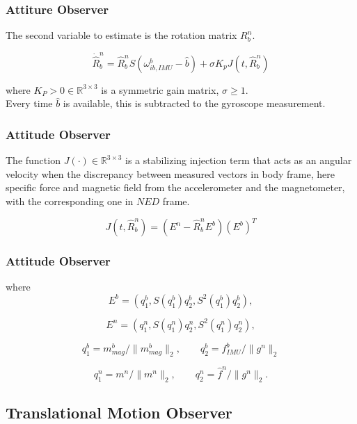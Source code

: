\documentclass{beamer}
\begin{document}
	\begin{frame}
		\frametitle{Attiture Observer}
		The second variable to estimate is the rotation matrix $R^n_b$.
		
		\[ \dot{\hat{R}}^n_b  =  \hat{R}^n_b S(\omega^b_{ib,IMU} - \hat{b}) + \sigma K_pJ(t, \hat{R}^n_b)       \]
		
		\vspace{0.3cm}
		where $K_P > 0 \in \mathds{R}^{3\times 3}$ is a symmetric gain matrix, $\sigma \geq 1$.\\ 
		\vspace{0.3cm}
		Every time $\hat{b}$ is available, this is subtracted to the gyroscope measurement.\\
	\end{frame}


	\begin{frame}
 		\frametitle{Attitude Observer}
 		The function $J(\cdot) \in  \mathds{R}^{3\times 3}$ is a stabilizing injection term that acts as an angular velocity when the discrepancy between measured vectors in body frame, here specific force and magnetic field from the accelerometer and the magnetometer, with the corresponding one in $NED$ frame.
 		
 		\[ J(t, \hat{R}^n_b)  = (E^n - \hat{R}^n_b E^b)(E^b)^T   \]

 		

	\end{frame}

	\begin{frame}
		\frametitle{Attitude Observer}
		where
		\[ E^b = (q_1^b, S(q^b_1)q_2^b, S^2(q_1^b)q_2^b),    \]
		
		\[ E^n = (q_1^n, S(q^n_1)q_2^n, S^2(q_1^n)q_2^n),    \]
		
		
		\[ q_1^b = m^b_{mag}/\|m^b_{mag}\|_2, \qquad q_2^b = f^b_{IMU}/\|g^n\|_2    \]
		
		\[ q_1^n = m^n/\|m^n\|_2, \qquad q_2^n = \hat{f}^n/\|g^n\|_2.\]
		
	\end{frame}
\subsection{Translational Motion Observer}
\end{document}
